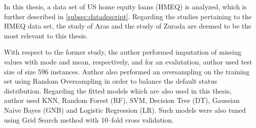 In this thesis, a data set of US home equity loans (HMEQ) is analyzed, which is further described in \autoref{subsec:datadescript}.
Regarding the studies pertaining to the HMEQ data set, the study of Aras \citep{serkan2021bagging} and the study of Zurada \citep{zurada2014classification} are deemed to be the most relevant to this thesis.


With respect to the former study, the author performed imputation of missing values with mode and mean, respectively, and for an evalutation, author used test size of size 596 instances.
Author also performed an oversampling on the training set using Random Oversampling in order to balance the default status distribution.
Regarding the fitted models which are also used in this thesis, author used KNN, Random Forest (RF), SVM, Decision Tree (DT), Gaussian Naive Bayes (GNB) and Logistic Regression (LR).
Such models were also tuned using Grid Search method with 10--fold cross validation.

